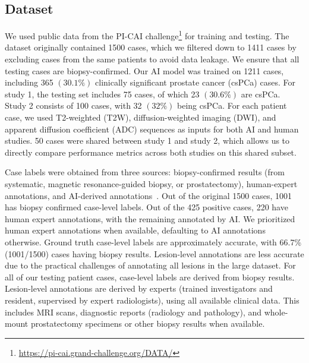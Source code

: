 \subsection{Dataset}

We used public data from the PI-CAI challenge\footnote{\url{https://pi-cai.grand-challenge.org/DATA/}} for training and testing.
The dataset originally contained 1500 cases, which we filtered down to 1411 cases by excluding cases from the same patients to avoid data leakage.
We ensure that all testing cases are biopsy-confirmed.
Our AI model was trained on 1211 cases, including 365 $(30.1\%)$ clinically significant prostate cancer (csPCa) cases. 
For study 1, the testing set includes 75 cases, of which 23 $(30.6\%)$ are csPCa.
Study 2 consists of 100 cases, with 32 $(32\%)$ being csPCa. 
For each patient case, we used T2-weighted (T2W), diffusion-weighted imaging (DWI), and apparent diffusion coefficient (ADC) sequences as inputs for both AI and human studies. 
50 cases were shared between study 1 and study 2, which allows us to directly compare performance metrics across both studies on this shared subset.


 Case labels were obtained from three sources: biopsy-confirmed results (from systematic, magnetic resonance-guided biopsy, or prostatectomy), human-expert annotations, and AI-derived annotations~\cite{bosma2021annotation}. Out of the original 1500 cases, 1001 has biopsy confirmed case-level labels. 
Out of the 425 positive cases, 220 have human expert annotations, with the remaining annotated by AI. We prioritized human expert annotations when available, defaulting to AI annotations otherwise.
Ground truth case-level labels are approximately accurate, with 66.7\% (1001/1500) cases having biopsy results. Lesion-level annotations are less accurate due to the practical challenges of annotating all lesions in the large dataset. 
For all of our testing patient cases, case-level labels are derived from biopsy results. Lesion-level annotations are derived by experts (trained investigators and resident, supervised by expert radiologists), using all available clinical data. This includes MRI scans, diagnostic reports (radiology and pathology), and whole-mount prostatectomy specimens or other biopsy results when available. 







